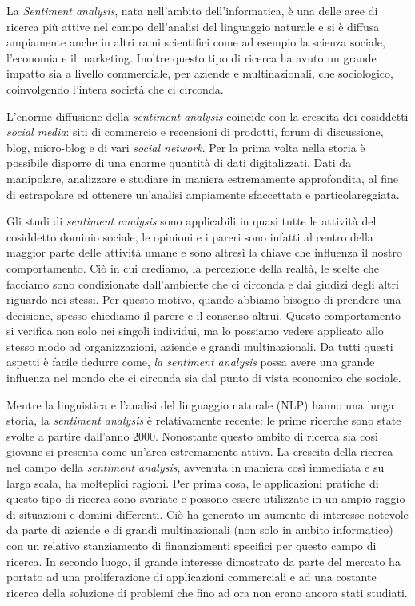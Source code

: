 \documentclass[a4paper,12pt,openright,twoside]{report}
\theoremstyle{definition}
\begin{document}
La \emph{Sentiment analysis}, nata nell'ambito dell'informatica, è una delle aree di ricerca più attive 
nel campo dell'analisi del linguaggio naturale e si è diffusa
ampiamente anche in altri rami scientifici come ad esempio la scienza sociale,
l'economia e il marketing. Inoltre questo tipo di ricerca
ha avuto un grande impatto sia a livello commerciale, per aziende e multinazionali, che sociologico, 
coinvolgendo l'intera società che ci circonda.

L'enorme diffusione della \emph{sentiment analysis} coincide con la 
crescita dei cosiddetti \emph{social media}: siti di commercio e recensioni di prodotti,
forum di discussione, blog, micro-blog e di vari \emph{social network}.
Per la prima volta nella storia è possibile disporre di una
enorme quantità di dati digitalizzati. Dati da manipolare, analizzare e studiare in maniera
estremamente approfondita, al fine di estrapolare ed ottenere un'analisi
ampiamente sfaccettata e particolareggiata.

Gli studi di \emph{sentiment analysis} sono applicabili in quasi tutte
le attività del cosiddetto dominio sociale, le opinioni e i pareri 
sono infatti al centro della maggior parte delle attività umane e sono 
altresì la chiave che influenza il nostro comportamento.
Ciò in cui crediamo, la percezione della realtà, le scelte che facciamo
sono condizionate dall’ambiente che ci circonda e dai giudizi 
degli altri riguardo noi stessi.
Per questo motivo, quando abbiamo bisogno
di prendere una decisione, spesso chiediamo il parere e il consenso altrui.
Questo comportamento si verifica non solo 
nei singoli individui, ma lo possiamo  vedere applicato allo stesso modo ad organizzazioni, aziende e grandi multinazionali.
Da tutti questi aspetti è facile dedurre 
come, \emph{la sentiment analysis} possa avere una grande influenza nel mondo che 
ci circonda sia dal punto di vista economico che sociale.

Mentre la linguistica e l'analisi del linguaggio naturale (NLP) hanno una lunga
storia, la \emph{sentiment analysis} è relativamente recente: le prime ricerche
sono state svolte a partire dall'anno 2000. Nonostante questo ambito di ricerca sia così giovane 
si presenta come un'area estremamente attiva.
La crescita della ricerca nel campo della \emph{sentiment analysis}, avvenuta in maniera così immediata e su larga scala, 
ha molteplici ragioni. 
Per prima cosa, le applicazioni pratiche 
di questo tipo di ricerca sono svariate e possono essere utilizzate in un ampio raggio di 
situazioni e domini differenti. Ciò ha generato un aumento di interesse notevole da parte di
aziende e di grandi multinazionali (non solo in ambito informatico)
con un relativo stanziamento di finanziamenti specifici per questo campo di ricerca.
In secondo luogo, il grande interesse dimostrato da parte del mercato ha portato ad una proliferazione di 
applicazioni commerciali e ad una costante ricerca della soluzione di problemi
che fino ad ora non erano ancora stati studiati.
\end{document}
